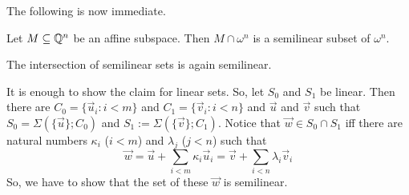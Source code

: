 The following is now immediate. 
\begin{lem}
\label{lem:QtoN}
Let $M \subseteq \mathbb{Q}^n$ be an affine subspace. Then $M \cap \omega^n$ 
is a semilinear subset of $\omega^n$.
\end{lem}
\begin{lem}
\label{lem:intersection}
The intersection of semilinear sets is again semilinear.
\end{lem}
\proofbeg
It is enough to show the claim for linear sets. So, let $S_0$ and 
$S_1$ be linear. Then there are $C_0 = \{\vec{u}_i : i < m\}$ and 
$C_1 = \{\vec{v}_i : i < n\}$ and $\vec{u}$ and $\vec{v}$ such 
that $S_0 = \Sigma(\{\vec{u}\}; C_0)$ and $S_1 := \Sigma(\{\vec{v}\}; C_1)$. 
Notice that $\vec{w} \in S_0 \cap S_1$ iff there are 
natural numbers $\kappa_i$ ($i < m$) and $\lambda_j$ ($j < n$) such that 
\begin{equation}
\vec{w} = \vec{u} + \sum_{i < m} \kappa_i \vec{u}_i = \vec{v} + 
\sum_{i < n} \lambda_i \vec{v}_i
\end{equation}
So, we have to show that the set of these $\vec{w}$ is semilinear. 

